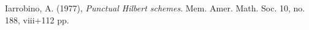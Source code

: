 \documentclass[12pt,oneside,reqno]{amsart}
\theoremstyle{definition}
\begin{document}

\begin{thebibliography}{ABCD}


Iarrobino, A. (1977), \textit{Punctual Hilbert schemes}. Mem. Amer. Math. Soc. 10, no. 188, viii+112 pp.







\end{thebibliography}
\end{document}
